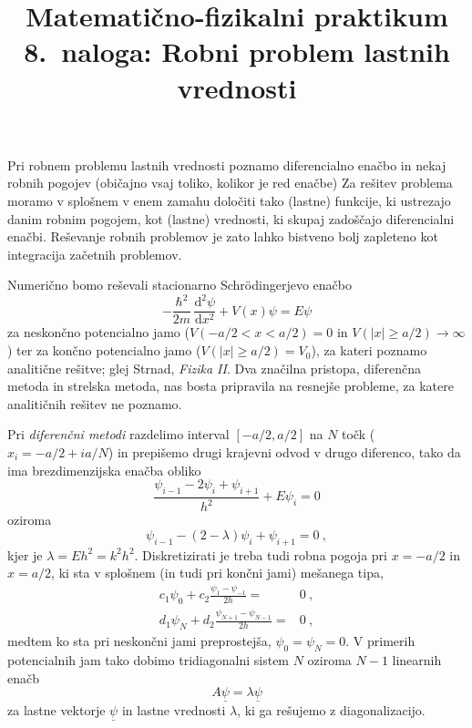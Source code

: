\documentclass[slovene,11pt,a4paper]{article}
\title{
\sc\large Matematično-fizikalni praktikum \thisyear \\
\bigskip
\bf\Large 8.~naloga: Robni problem lastnih vrednosti
}
\author{}
\date{}
\newcommand{\ddd}{\mathrm{d}}
\newcommand{\Dd}[3][{}]{\frac{\ddd^{#1} #2}{\ddd #3^{#1}}}
\begin{document}
\maketitle
\vspace{-1cm}

Pri robnem problemu lastnih vrednosti poznamo diferencialno enačbo
in nekaj robnih pogojev (običajno vsaj toliko, kolikor je red enačbe)
Za rešitev problema moramo v splošnem v enem zamahu določiti
tako (lastne) funkcije, ki ustrezajo danim robnim pogojem,
kot (lastne) vrednosti, ki skupaj zadoščajo diferencialni enačbi.
Reševanje robnih problemov je zato lahko bistveno bolj zapleteno
kot integracija začetnih problemov.


Numerično bomo reševali stacionarno Schr\"odingerjevo enačbo
\begin{equation*}
-\frac{\hbar^2}{2m}\,\Dd[2]{\psi}{x} + V(x)\psi = E\psi  
\end{equation*}
za neskončno potencialno jamo ($V(-a/2 < x < a/2)=0$ 
in $V(|x|\ge a/2)\to\infty$) ter za končno potencialno jamo
($V(|x|\ge a/2)=V_0$), za kateri poznamo analitične rešitve;
glej Strnad, {\sl Fizika II\/}.  Dva značilna pristopa, diferenčna
metoda in strelska metoda, nas bosta pripravila na resnejše probleme,
za katere analitičnih rešitev ne poznamo.

Pri {\sl diferenčni metodi\/} razdelimo interval
$[-a/2,a/2]$ na $N$ točk ($x_i = -a/2 + ia/N$) in prepišemo drugi
krajevni odvod v drugo diferenco, tako da ima brezdimenzijska enačba obliko
\begin{equation*}
\frac{\psi_{i-1} - 2\psi_i + \psi_{i+1}}{h^2} + E\psi_i = 0  
\end{equation*}
oziroma
\begin{equation*}
\psi_{i-1} - (2-\lambda)\psi_i + \psi_{i+1} = 0 \>,  
\end{equation*}
kjer je $\lambda=Eh^2=k^2h^2$.  Diskretizirati je treba tudi robna
pogoja pri $x=-a/2$ in $x=a/2$, ki sta v splošnem (in tudi
pri končni jami) mešanega tipa,
\begin{align*}
c_1 \psi_0 + c_2 \frac{\psi_1 - \psi_{-1}}{2h} =& 0 \>, \\
d_1 \psi_N + d_2 \frac{\psi_{N+1} - \psi_{N-1}}{2h} =& 0 \>,
\end{align*}
medtem ko sta pri neskončni jami preprostejša, $\psi_0=\psi_N=0$.
V primerih potencialnih jam tako dobimo tridiagonalni sistem $N$
oziroma $N-1$ linearnih enačb
\begin{equation*}
A \underline{\psi} = \lambda \underline{\psi}   
\end{equation*}
za lastne vektorje $\underline{\psi}$ in lastne vrednosti $\lambda$,
ki ga rešujemo z diagonalizacijo.  
\end{document}
